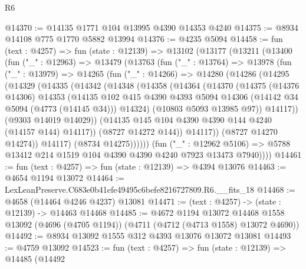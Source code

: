 \begin{lexlean}{R6}
\begin{coremodule}
@14370 := @14135 @1771 @104 @13995 @4390 @14353 @4240
@14375 := @8934 @14108 @775 @1770 @5882 @13994
@14376 := @4235 @5094
@14458 := fun (text : @4257) =>
  fun (state : @12139) =>
  @13102
    (@13177
      (@13211
        (@13400
          (fun ("_" : @12963) =>
          @13479
            (@13763
              (fun ("_" : @13764) =>
              @13978
                (fun ("_" : @13979) =>
                @14265
                  (fun ("_" : @14266) =>
                  @14280
                    (@14286
                      (@14295
                        (@14329
                          (@14335
                            (@14342
                              (@14348
                                (@14358
                                  (@14364
                                    (@14370
                                      (@14375
                                        (@14376 @14306)
                                        @14353
                                        (@14135
                                          @102
                                          @415
                                          @4390
                                          @4393
                                          @5094
                                          @14306
                                          (@14142 @34 @5094 (@4773 (@14145 @34)))
                                          @14324)
                                        (@10803 @5093 @13985 @97))
                                      @14117))
                                  (@9303 @14019 @14029))
                                (@14135 @145 @104 @4390 @4390 @144 @4240 (@14157 @144) @14117))
                              (@8727 @14272 @144))
                            @14117))
                        (@8727 @14270 @14274))
                      @14117)
                    (@8734 @14275))))))
          (fun ("_" : @12962 @5106) =>
          @5788 @13412 @214 @1519 @104 @4390 @4390 @4240 @7923 @13473 @7940))))
@14461 := fun (text : @4257) => fun (state : @12139) => @4394 @13076
@14463 := @4654 @1194 @13072
@14464 := LexLeanPreserve.C683e0b41efe49495c6befe8216727809.R6.__fits_18
@14468 := @4658 (@14464 @4246 @4237) @13081
@14471 := (text : @4257) -> (state : @12139) -> @14463 @14468
@14485 := @4672
    @1194
    @13072
    @14468
    @1558
    @13092
    (@4696 (@4705 @1194))
    (@4711 (@4712 (@4713 @1558) @13072 @4690))
@14492 := @8934 @13092 @1555 @312 @4393 @13076 @13072 @13081
@14493 := @4759 @13092
@14523 := fun (text : @4257) =>
  fun (state : @12139) =>
  @14485
    (@14492

\end{coremodule}
\end{lexlean}
